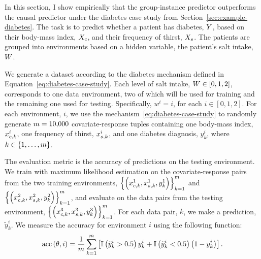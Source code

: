 \documentclass[../thesis.tex]{subfiles}
\begin{document}
In this section, I show empirically that the group-instance predictor outperforms the causal predictor under the diabetes case study from Section~\ref{sec:example-diabetes}. The task is to predict whether a patient has diabetes, $\myrv{y}$, based on their body-mass index, $\myrv{x}_{c}$, and their frequency of thirst, $\myrv{x}_{s}$. The patients are grouped into environments based on a hidden variable, the patient's salt intake, $\myrv{w}$.

We generate a dataset according to the diabetes mechanism defined in Equation~\ref{eq:diabetes-case-study}. Each level of salt intake, $\myrv{w} \in [0, 1, 2]$, corresponds to one data environment, two of which will be used for training and the remaining one used for testing. Specifically, $w^i = i$, for each $i \in [0,1,2]$. For each environment, $i$, we use the mechanism~\ref{eq:diabetes-case-study} to randomly generate $m = \num{10000}$ covariate-response tuples containing one body-mass index, $x^i_{c, k}$, one frequency of thirst, $x^i_{s, k}$, and one diabetes diagnosis, $y^i_k$, where $k \in \{1,\dots,m\}$.

The evaluation metric is the accuracy of predictions on the testing environment. We train with maximum likelihood estimation on the covariate-response pairs from the two training environments, $\left\{ \left(x^1_{c, k}, x^1_{s, k}, y^1_{k} \right) \right\}_{k=1}^{m}$ and $\left\{ \left( x^2_{c, k}, x^2_{s, k}, y^2_{k} \right) \right\}_{k=1}^{m}$, and evaluate on the data pairs from the testing environment, $\left\{ \left( x^3_{c, k}, x^3_{s, k}, y^3_{k} \right) \right\}_{k=1}^{m}$. For each data pair, $k$, we make a prediction, $\tilde{y}^i_k$. We measure the accuracy for environment $i$ using the following function:
\[
    \mathrm{acc} \left( \theta, i \right) = \frac{1}{m} \sum_{k=1}^{m} \left[ \mathbb{I} \left( \tilde{y}^i_k > 0.5 \right)  y^i_k  + \mathbb{I}\left( \tilde{y}^i_k < 0.5 \right)  \left(1 - y^i_k \right) \right].
\]
\end{document}
